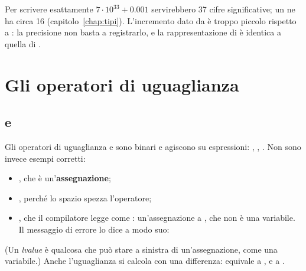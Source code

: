 Per scrivere esattamente $7 \cdot 10^{33} + 0.001$ servirebbero 37 cifre
significative; un  ne ha circa 16
(capitolo~\ref{chap:tipi}). L'incremento dato da  è troppo piccolo
rispetto a : la precisione non basta a registrarlo, e la
rappresentazione di  è identica a quella di .

\section{Gli operatori di uguaglianza}

\subsection{\code{==} e \code{!=}}

Gli operatori di uguaglianza \code{==} e \code{!=} sono binari e agiscono su
espressioni: , , . Non
sono invece esempi corretti:

\begin{itemize}
  \item {}, che è un'\textbf{assegnazione};
  \item {}, perché lo spazio spezza l'operatore;
  \item {}, che il compilatore legge come
        : un'assegnazione a , che non è una
        variabile. Il messaggio di errore lo dice a modo suo:
\end{itemize}


(Un \textit{lvalue} è qualcosa che può stare a sinistra di un'assegnazione,
come una variabile.) Anche l'uguaglianza si calcola con una differenza:
 equivale a , e
 a .

